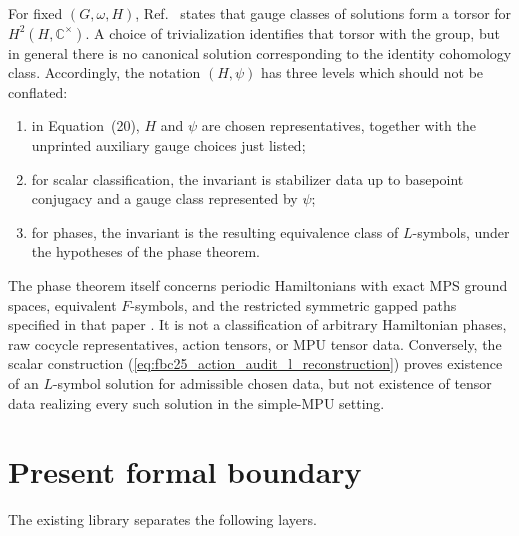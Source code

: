 \documentclass{article}
\begin{document}
For fixed $(G,\omega,H)$, Ref.~\cite[source line~761]{GarreRubio2023MPOSym}
states that gauge classes of solutions form a torsor for
$H^2(H,\mathbb C^\times)$.  A choice of trivialization identifies that torsor
with the group, but in general there is no canonical solution corresponding
to the identity cohomology class.  Accordingly, the notation $(H,\psi)$ has
three levels which should not be conflated:
\begin{enumerate}
    \item in Equation~(20), $H$ and $\psi$ are chosen representatives, together
          with the unprinted auxiliary gauge choices just listed;
    \item for scalar classification, the invariant is stabilizer data up to
          basepoint conjugacy and a gauge class represented by $\psi$;
    \item for phases, the invariant is the resulting equivalence class of
          $L$-symbols, under the hypotheses of the phase theorem.
\end{enumerate}
The phase theorem itself concerns periodic Hamiltonians with exact MPS ground
spaces, equivalent $F$-symbols, and the restricted symmetric gapped paths
specified in that paper
\cite[source lines~1219--1272, especially the main result at line~1231]
{GarreRubio2023MPOSym}.  It is not a classification of arbitrary Hamiltonian
phases, raw cocycle representatives, action tensors, or MPU tensor data.
Conversely, the scalar construction
(\ref{eq:fbc25_action_audit_l_reconstruction}) proves existence of an
$L$-symbol solution for admissible chosen data, but not existence of tensor
data realizing every such solution in the simple-MPU setting.

\section{Present formal boundary}

The existing library separates the following layers.
\end{document}
